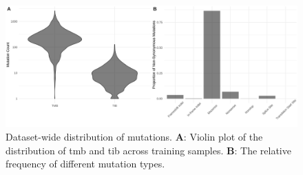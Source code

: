 \documentclass[10pt,twoside,openright]{report}
\begin{document}
\begin{figure}[htbp]
\centering
\includegraphics[width=6in]{data_stats.png}
\vspace*{-5mm}
\caption{ Dataset-wide distribution of mutations. \textbf{A}: Violin plot of the distribution of \acrshort{tmb} and \acrshort{tib} across training samples. \textbf{B}: The relative frequency of different mutation types. \label{fig:trainingdata}}
\vspace*{-2mm}
\end{figure}
\end{document}
